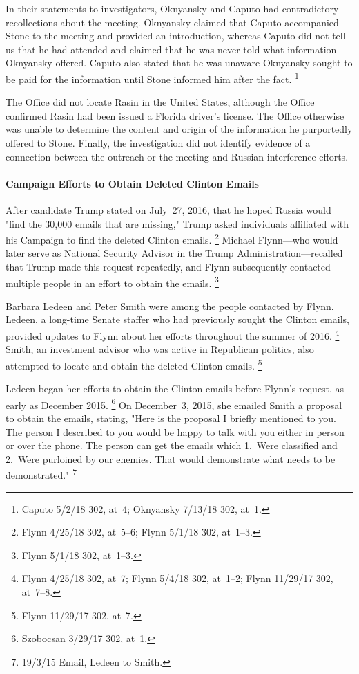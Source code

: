 In their statements to investigators, Oknyansky and Caputo had contradictory recollections about the meeting.
Oknyansky claimed that Caputo accompanied Stone to the meeting and provided an introduction, whereas Caputo did not tell us that he had attended and claimed that he was never told what information Oknyansky offered.
Caputo also stated that he was unaware Oknyansky sought to be paid for the information until Stone informed him after the fact.%
\footnote{Caputo 5/2/18 302, at~4;
Oknyansky 7/13/18 302, at~1.}

The Office did not locate Rasin in the United States, although the Office confirmed Rasin had been issued a  Florida driver's license.
The Office otherwise was unable to determine the content and origin of the information he purportedly offered to Stone.
Finally, the investigation did not identify evidence of a connection between the outreach or the meeting and Russian interference efforts.

\paragraph{Campaign Efforts to Obtain Deleted Clinton Emails}

After candidate Trump stated on July~27, 2016, that he hoped Russia would "find the 30,000 emails that are missing," Trump asked individuals affiliated with his Campaign to find the deleted Clinton emails.%
\footnote{Flynn 4/25/18 302, at~5--6;
Flynn 5/1/18 302, at~1--3.}
Michael Flynn---who would later serve as National Security Advisor in the Trump Administration---recalled that Trump made this request repeatedly, and Flynn subsequently contacted multiple people in an effort to obtain the emails.%
\footnote{Flynn 5/1/18 302, at~1--3.}

Barbara Ledeen and Peter Smith were among the people contacted by Flynn.
Ledeen, a long-time Senate staffer who had previously sought the Clinton emails, provided updates to Flynn about her efforts throughout the summer of 2016.%
\footnote{ Flynn 4/25/18 302, at~7; Flynn 5/4/18 302, at~1--2; Flynn 11/29/17 302, at~7--8.}
Smith, an investment advisor who was active in Republican politics, also attempted to locate and obtain the deleted Clinton emails.%
\footnote{ Flynn 11/29/17 302, at~7.}

Ledeen began her efforts to obtain the Clinton emails before Flynn's request, as early as December 2015.%
\footnote{Szobocsan 3/29/17 302, at~1.}
On December~3, 2015, she emailed Smith a proposal to obtain the emails, stating, "Here is the proposal I briefly mentioned to you.
The person I described to you would be happy to talk with you either in person or over the phone.
The person can get the emails which 1.~Were classified and 2.~Were purloined by our enemies.
That would demonstrate what needs to be demonstrated."%
\footnote{19/3/15 Email, Ledeen to Smith.}

